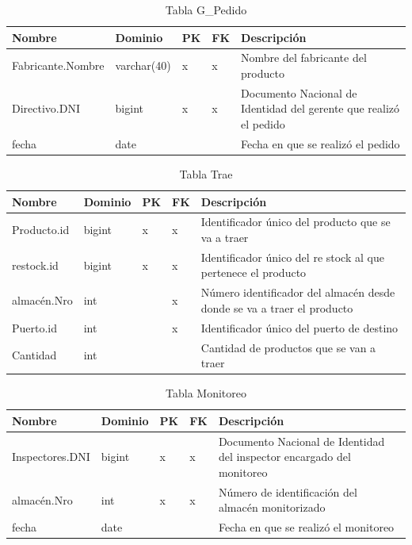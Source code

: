 \documentclass[10pt, a4paper,openany]{report}
\begin{document}
\begin{table}[h]
\centering
\begin{tabular}{|l|p{1.5cm}|p{0.5cm}|p{0.5cm}|p{3cm}|}
\hline
\textbf{Nombre} &
\textbf{Dominio} &
\textbf{PK} &
\textbf{FK} &
\textbf{Descripción} \\
\hline
Fabricante.Nombre & varchar(40) & x & x & Nombre del fabricante del producto \\
\hline
Directivo.DNI & bigint & x& x & Documento Nacional de Identidad del gerente que realizó el pedido \\
\hline
fecha & date & & & Fecha en que se realizó el pedido \\
\hline
\end{tabular}
\caption{Tabla G\_Pedido}
\end{table}

\begin{table}[h]
\centering
\begin{tabular}{|l|p{1.5cm}|p{0.5cm}|p{0.5cm}|p{3cm}|}
\hline
\textbf{Nombre} &
\textbf{Dominio} &
\textbf{PK} &
\textbf{FK} &
\textbf{Descripción} \\
\hline
Producto.id & bigint & x & x & Identificador único del producto que se va a traer \\
\hline
restock.id & bigint & x & x & Identificador único del re stock al que pertenece el producto \\
\hline
almacén.Nro & int & & x & Número identificador del almacén desde donde se va a traer el producto \\
\hline
Puerto.id & int & & x & Identificador único del puerto de destino \\
\hline
Cantidad & int & & & Cantidad de productos que se van a traer \\
\hline
\end{tabular}
\caption{Tabla Trae}
\end{table}


\begin{table}[h]
\centering
\begin{tabular}{|l|p{1.5cm}|p{0.5cm}|p{0.5cm}|p{3cm}|}
\hline
\textbf{Nombre} &
\textbf{Dominio} &
\textbf{PK} &
\textbf{FK} &
\textbf{Descripción} \\
\hline
Inspectores.DNI & bigint & x & x & Documento Nacional de Identidad del inspector encargado del monitoreo \\
\hline
almacén.Nro & int & x & x & Número de identificación del almacén monitorizado \\
\hline
fecha & date & & & Fecha en que se realizó el monitoreo \\
\hline
\end{tabular}
\caption{Tabla Monitoreo}
\end{table}
\end{document}
